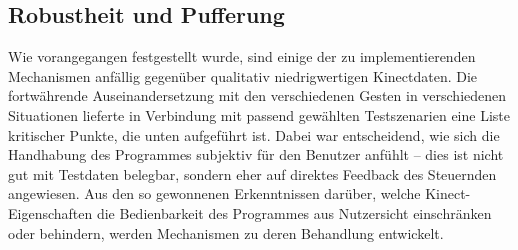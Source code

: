 	\subsection{Robustheit und Pufferung}\label{sec:robustheit}
	Wie vorangegangen festgestellt wurde, sind einige der zu implementierenden Mechanismen anfällig gegenüber qualitativ niedrigwertigen Kinectdaten. Die fortwährende Auseinandersetzung mit den verschiedenen Gesten in verschiedenen Situationen lieferte in Verbindung mit passend gewählten Testszenarien eine Liste kritischer Punkte, die unten aufgeführt ist. Dabei war entscheidend, wie sich die Handhabung des Programmes subjektiv für den Benutzer anfühlt -- dies ist nicht gut mit Testdaten belegbar, sondern eher auf direktes Feedback des Steuernden angewiesen. Aus den so gewonnenen Erkenntnissen darüber, welche Kinect-Eigenschaften die Bedienbarkeit des Programmes aus Nutzersicht einschränken oder behindern, werden Mechanismen zu deren Behandlung entwickelt.
